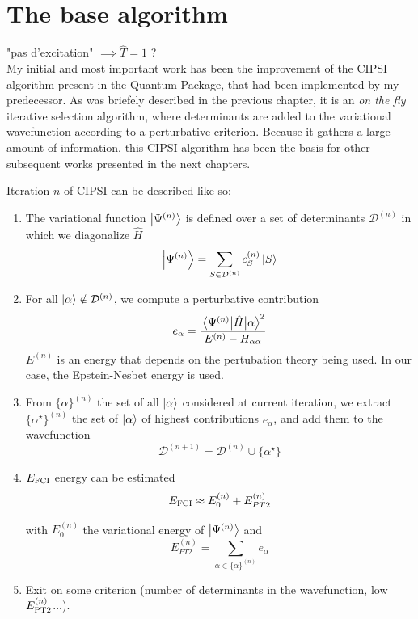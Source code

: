 \documentclass[./thesis.tex]{subfiles}
\begin{document}
\label{chap:CIPSI}


\section{The base algorithm}
\alert{"pas d'excitation" $\implies \hat T = 1$ ?}\\
My initial and most important work has been the improvement of the CIPSI algorithm present in the Quantum Package, that had been implemented by my predecessor\cite{giner:tel-01077016}. As was briefely described in the previous chapter, it is an \emph{on the fly} iterative selection algorithm, where determinants are added to the variational wavefunction according to a perturbative criterion. Because it gathers a large amount of information, this CIPSI algorithm has been the basis for other subsequent works presented in the next chapters.

Iteration $n$ of CIPSI can be described like so:

\begin{enumerate}
\item

The variational function $\ket {\Psi^{(n)}}$ is defined over a set of determinants $  \mathcal{D}^{(n)}$ in which we diagonalize $\widehat{H}$
\begin{equation}
\ket{\Psi^{(n)}} = \sum_{S \in \mathcal{D}^{(n)}} c_S^{(n)} \ket{S}
\end{equation}

\item
For all ${\ket{\alpha}} \notin \mathcal{D}^{(n)}$, we compute a perturbative contribution
\begin{equation}
e_\alpha = \frac{\mel{\Psi^{(n)}}{\hat{H}}{\alpha}^2}{E^{(n)} - H_{\alpha \alpha}}
\end{equation}
$E^{(n)}$ is an energy that depends on the pertubation theory being used. In our case, the Epstein-Nesbet energy is used.

\item
From $\{ \alpha \}^{(n)}$ the set of all ${\ket{\alpha}}$ considered at current iteration, we extract $\{ \alpha^\star \}^{(n)}$ the set of ${\ket{\alpha}}$ of highest contributions $e_\alpha$, and add them to the wavefunction
\begin{equation}
\mathcal{D}^{(n+1)} = \mathcal{D}^{(n)} \cup \{ \alpha^\star \}
\end{equation}

\item
$E_\text{FCI}$ energy can be estimated
\begin{equation}
E_\text{FCI} \approx E^{(n)}_0 + E_{PT2}^{(n)}
\end{equation}


with $E^{(n)}_0$ the variational energy of $\ket {\Psi^{(n)}}$ and
\begin{equation}
E_{PT2}^{(n)} = \sum_{\alpha \in \{\alpha \}^{(n)}} e_\alpha
\end{equation}
\item
Exit on some criterion (number of determinants in the wavefunction, low $E_\text{PT2}^{(n)}$...).

\end{enumerate}
\end{document}

